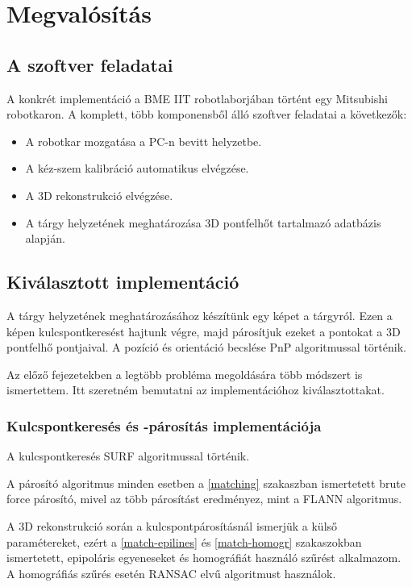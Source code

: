 \chapter{Megvalósítás}
\section{A szoftver feladatai}
A konkrét implementáció a BME IIT robotlaborjában történt egy Mitsubishi robotkaron. A komplett, több komponensből álló szoftver feladatai a következők:

\begin{itemize}
\item A robotkar mozgatása a PC-n bevitt helyzetbe.
\item A kéz-szem kalibráció automatikus elvégzése.
\item A 3D rekonstrukció elvégzése.
\item A tárgy helyzetének meghatározása 3D pontfelhőt tartalmazó adatbázis alapján.
\end{itemize}	

\section{Kiválasztott implementáció}
A tárgy helyzetének meghatározásához készítünk egy képet a tárgyról. Ezen a képen kulcspontkeresést hajtunk végre, majd párosítjuk ezeket a pontokat a 3D pontfelhő pontjaival. A pozíció és orientáció becslése PnP algoritmussal történik.

Az előző fejezetekben a legtöbb probléma megoldására több módszert is ismertettem. Itt szeretném bemutatni az implementációhoz kiválasztottakat.

\subsection{Kulcspontkeresés és -párosítás implementációja}
A kulcspontkeresés SURF algoritmussal történik. 

A párosító algoritmus minden esetben a \ref{matching} szakaszban ismertetett brute force párosító, mivel az több párosítást eredményez, mint a FLANN algoritmus. 

A 3D rekonstrukció során a kulcspontpárosításnál ismerjük a külső paramétereket, ezért a \ref{match-epilines} és \ref{match-homogr} szakaszokban ismertetett, epipoláris egyeneseket és homográfiát használó szűrést alkalmazom. A homográfiás szűrés esetén RANSAC elvű algoritmust használok.

